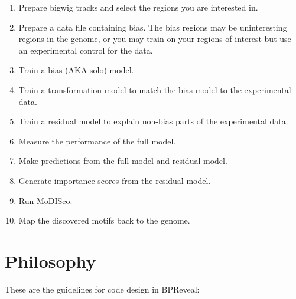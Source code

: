 \documentclass{article}
\begin{document}
\begin{enumerate}
    \item Prepare bigwig tracks and select the regions you are interested in.
    \item Prepare a data file containing bias. The bias regions may be uninteresting regions in
        the genome, or you may train on your regions of interest but use an experimental control
        for the data.
    \item Train a bias (AKA solo) model.
    \item Train a transformation model to match the bias model to the experimental data.
    \item Train a residual model to explain non-bias parts of the experimental data.
    \item Measure the performance of the full model.
    \item Make predictions from the full model and residual model.
    \item Generate importance scores from the residual model.
    \item Run MoDISco.
    \item Map the discovered motifs back to the genome.
\end{enumerate}

\newpage

\section{Philosophy}

These are the guidelines for code design in BPReveal:
\end{document}
